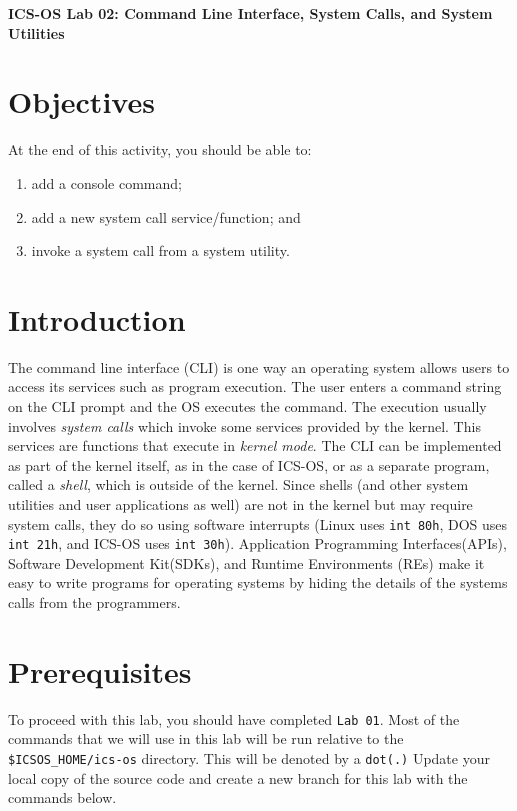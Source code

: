 \documentclass[a4paper, 11pt,oneside]{article}
\begin{document}
\begin{center}
   {\LARGE \textbf{ICS-OS Lab 02: Command Line Interface, System Calls, and System
Utilities }}
\end{center}

\section*{Objectives}
   At the end of this activity, you should be able to:
   \begin{enumerate}[itemsep=0pt,parsep=0pt]
       \item add a console command;
       \item add a new system call service/function; and
       \item invoke a system call from a system utility.
   \end{enumerate}   

\section{Introduction}
The command line interface (CLI) is one way an operating system allows users to
access its services such as program execution.  The user enters a command
string on the CLI prompt and the OS executes the command. The execution usually
involves \textit{system calls} which invoke some services provided by the 
kernel. This services are functions that execute in \textit{kernel mode}. 
The CLI can be implemented as part of the kernel itself, as in the case of 
ICS-OS, or as a separate program, called a \textit{shell}, which is outside of 
the kernel.  Since shells (and other system utilities and user applications as 
well) are not in the kernel but may require system calls, they do so using 
software interrupts (Linux uses \texttt{int 80h}, DOS uses \texttt{int 21h}, 
and ICS-OS uses \texttt{int 30h}). Application Programming Interfaces(APIs), 
Software Development Kit(SDKs), and Runtime Environments (REs) make it easy to 
write programs for operating systems by hiding the details of the systems calls 
from the programmers.


\section{Prerequisites}
To proceed with this lab, you should have completed \texttt{Lab 01}. Most of 
the commands that we will use in this lab will be run relative to the 
\texttt{\$ICSOS\_HOME/ics-os} directory. This will be denoted by a 
\texttt{dot(.)} Update your local copy of the source code and create a new 
branch for this lab with the commands below.
\end{document}
